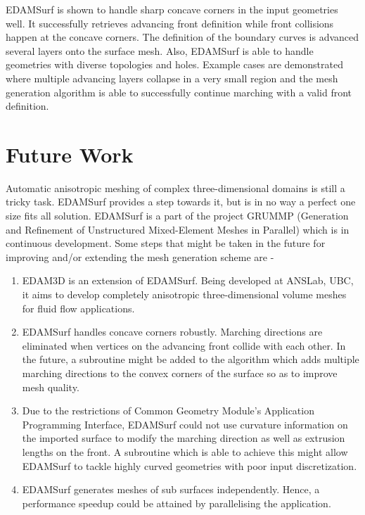 EDAMSurf is shown to handle sharp concave corners in the input geometries well. It successfully retrieves advancing front definition while front collisions happen at the concave corners. The definition of the boundary curves is advanced several layers onto the surface mesh. Also, EDAMSurf is able to handle geometries with diverse topologies and holes. Example cases are demonstrated where multiple advancing layers collapse in a very small region and the mesh generation algorithm is able to successfully continue marching with a valid front definition.

\section{Future Work}

Automatic anisotropic meshing of complex three-dimensional domains is still a tricky task. EDAMSurf provides a step towards it, but is in no way a perfect one size fits all solution. EDAMSurf is a part of the project GRUMMP (Generation and Refinement of Unstructured Mixed-Element Meshes in Parallel)\cite{ollivier2010grummp} which is in continuous development. Some steps that might be taken in the future for improving and/or extending the mesh generation scheme are -

\begin{enumerate}
	\item EDAM3D is an extension of EDAMSurf. Being developed at ANSLab, UBC, it aims to develop completely anisotropic three-dimensional volume meshes for fluid flow applications.
	\item EDAMSurf handles concave corners robustly. Marching directions are eliminated when vertices on the advancing front collide with each other. In the future, a subroutine might be added to the algorithm which adds multiple marching directions to the convex corners of the surface so as to improve mesh quality.
	\item Due to the restrictions of Common Geometry Module's Application Programming Interface, EDAMSurf could not use curvature information on the imported surface to modify the marching direction as well as extrusion lengths on the front. A subroutine which is able to achieve this might allow EDAMSurf to tackle highly curved geometries with poor input discretization.
	\item EDAMSurf generates meshes of sub surfaces independently. Hence, a performance speedup could be attained by parallelising the application.
\end{enumerate}








